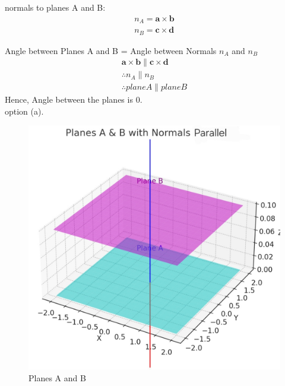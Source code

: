 \documentclass[journal]{IEEEtran}
\begin{document}
normals to planes A and B:
\begin{align}
n_A = \mathbf{a} \times \mathbf{b}\\
n_B = \mathbf{c} \times \mathbf{d}
\end{align}

Angle between Planes A and B = Angle between Normals $n_A$ and $n_B$\\
\begin{align}
\mathbf{a} \times \mathbf{b} \parallel \mathbf{c} \times \mathbf{d}\\
\therefore n_A \parallel n_B\\
\therefore plane A \parallel plane B
\end{align}
Hence, Angle between the planes is $0$.\\option (a).
\begin{figure}
    \centering[H]
    \includegraphics[width=0.75\columnwidth]{figs/graph .jpg}
    \caption{Planes A and B}
    \label{fig:placeholder}
\end{figure}
\end{document}
